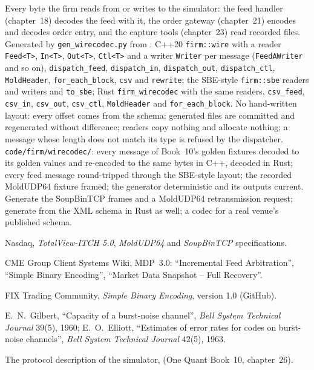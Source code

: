 \begin{build}
 Every byte the firm reads from or writes to the simulator: the feed handler (chapter~18) decodes the feed
with it, the order gateway (chapter~21) encodes and decodes order entry, and the capture tools (chapter~23) read recorded
files.
 Generated by \texttt{gen\_wirecodec.py} from : C++20
\texttt{firm::wire} with a reader \texttt{Feed<T>}, \texttt{In<T>}, \texttt{Out<T>}, \texttt{Ctl<T>} and a writer
\texttt{Writer} per message (\texttt{FeedAWriter} and so on), \texttt{dispatch\_feed}, \texttt{dispatch\_in}, \texttt{dispatch\_out},
\texttt{dispatch\_ctl}, \texttt{MoldHeader}, \texttt{for\_each\_block}, \texttt{csv} and \texttt{rewrite}; the SBE-style
\texttt{firm::sbe} readers and writers and \texttt{to\_sbe}; Rust \texttt{firm\_wirecodec} with the same readers,
\texttt{csv\_feed}, \texttt{csv\_in}, \texttt{csv\_out}, \texttt{csv\_ctl}, \texttt{MoldHeader} and \texttt{for\_each\_block}.
 No hand-written layout: every offset comes from the schema; generated files are committed and regenerated
without difference; readers copy nothing and allocate nothing; a message whose length does not match its type is refused by
the dispatcher.
 \texttt{code/firm/wirecodec/}: every message of Book~10's golden fixtures decoded to its golden
values and re-encoded to the same bytes in C++, decoded in Rust; every feed message round-tripped through the SBE-style layout;
the recorded MoldUDP64 fixture framed; the generator deterministic and its outputs current.
 Generate the SoupBinTCP frames and a MoldUDP64 retransmission request; generate from the XML schema in Rust
as well; a codec for a real venue's published schema.
\end{build}

\begin{omsources}
\item Nasdaq, \emph{TotalView-ITCH 5.0}, \emph{MoldUDP64} and \emph{SoupBinTCP} specifications.
\item CME Group Client Systems Wiki, MDP~3.0: ``Incremental Feed Arbitration'', ``Simple Binary Encoding'', ``Market Data
Snapshot -- Full Recovery''.
\item FIX Trading Community, \emph{Simple Binary Encoding}, version 1.0 (GitHub).
\item E.~N.~Gilbert, ``Capacity of a burst-noise channel'', \emph{Bell System Technical Journal} 39(5), 1960; E.~O.~Elliott,
``Estimates of error rates for codes on burst-noise channels'', \emph{Bell System Technical Journal} 42(5), 1963.
\item The protocol description of the simulator,  (One Quant Book~10, chapter~26).
\end{omsources}

